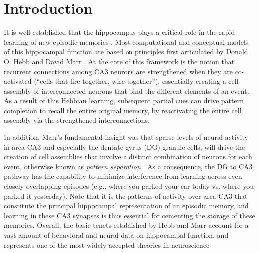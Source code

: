 \documentclass[10pt,letterpaper]{article}
\begin{document}
\linenumbers

\section*{Introduction}
It is well-established that the hippocampus plays a critical role in the rapid learning of new episodic memories \cite{EichenbaumYonelinasRanganath07}.  Most computational and conceptual models of this hippocampal function are based on principles first articulated by Donald O. Hebb and David Marr \cite{Hebb49,Marr71,McNaughtonNadel90,McClellandMcNaughtonOReilly95}.  At the core of this framework is the notion that recurrent connections among CA3 neurons are strengthened when they are co-activated (``cells that fire together, wire together''), essentially creating a cell assembly of interconnected neurons that bind the different elements of an event.  As a result of this Hebbian learning, subsequent partial cues can drive pattern completion to recall the entire original memory, by reactivating the entire cell assembly via the strengthened interconnections.

In addition, Marr's fundamental insight was that sparse levels of neural activity in area CA3 and especially the dentate gyrus (DG) granule cells, will drive the creation of cell assemblies that involve a distinct combination of neurons for each event, otherwise known as \emph{pattern separation} \cite{Marr71,OReillyMcClelland94,YassaStark11}.  As a consequence, the DG to CA3 pathway has the capability to minimize interference from learning across even closely overlapping episodes (e.g., where you parked your car today vs. where you parked it yesterday).  Note that it is the patterns of activity over area CA3 that constitute the principal hippocampal representation of an episodic memory, and learning in these CA3 synapses is thus essential for cementing the storage of these memories.  Overall, the basic tenets established by Hebb and Marr account for a vast amount of behavioral and neural data on hippocampal function, and represents one of the most widely accepted theories in neuroscience \cite{MilnerSquireKandel98,OReillyBhattacharyyaHowardEtAl14,Eichenbaum16,YonelinasRanganathEkstromEtAl19}
 
\end{document}
